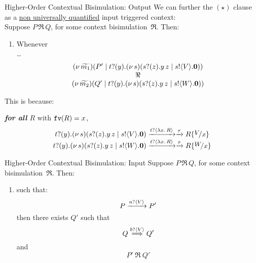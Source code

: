 \documentclass{beamer}
\begin{document}
	\begin{frame}{Higher-Order Contextual Bisimulation: Output}
		We can further the $(\star)$ clause as a \underline{non universally quantified} input triggered context:
		\\[2mm]

		Suppose $P \,\Re\, Q$, for some context bisimulation~$\Re$. Then:
		\begin{enumerate}[$(\star)$]
			\item	Whenever\\
				\dots\\
				\[
					\begin{array}{c}
						(\nu\, \widetilde{m_1})(P' \;|\; t ? (y) .(\nu\, s)(s ? (z) . y\, {z} \;|\; s ! \langle V \rangle . \mathbf{0}))
						\\
						\Re
						\\
						(\nu\, \widetilde{m_2})(Q' \;|\; t ? (y) .(\nu\, s)(s ? (z) . y\, {z} \;|\; s ! \langle W \rangle . \mathbf{0}))
					\end{array}
				\]
		\end{enumerate}

		This is because:

		\emph{\textbf{for all} $R$} with $\mathtt{fv}(R)=x$, 
		\[
			\begin{array}{c}
			\binp{t}{y}\newsp{s}{\binp{s}{z} \appl{y}{z} \Par \bout{s}{V} \inact}
			\by{\bactinp{t}{\abs{x}{R}}} \by{\tau}
			R \subst{V}{x}
			\\
			\binp{t}{y}\newsp{s}{\binp{s}{z} \appl{y}{z} \Par \bout{s}{W} \inact}
			\by{\bactinp{t}{\abs{x}{R}}} \by{\tau}
			R \subst{W}{x}
			\end{array}
		\]
	\end{frame}

	\begin{frame}{Higher-Order Contextual Bisimulation: Input}
		Suppose $P \,\Re\, Q$, for some context bisimulation~$\Re$. Then:
		\begin{enumerate}[$(\bullet)$]
			\item	{} such that:
				\[
					P \xrightarrow{n ? \langle V \rangle} P'
				\]
				then there exists $Q'$ such that
				\[
					Q \stackrel{b ? \langle V \rangle}{\Longrightarrow} Q'
				\]
				and
				\[
					P'\ \Re\ Q'
				\]
		\end{enumerate}
	\end{frame}
\end{document}
